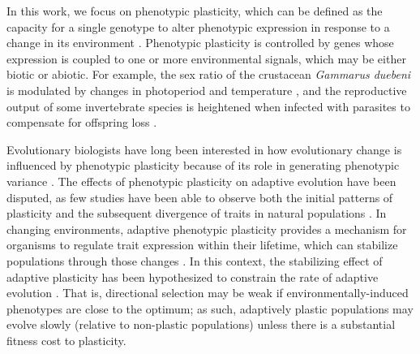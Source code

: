 \begin{raggedbottom}
In this work, we focus on phenotypic plasticity, which can be defined as the capacity for a single genotype to alter phenotypic expression in response to a change in its environment \citep{west-eberhard_developmental_2003}.
Phenotypic plasticity is controlled by genes whose expression is coupled to one or more environmental signals, which may be either biotic or abiotic.
For example, the sex ratio of the crustacean \textit{Gammarus duebeni} is modulated by changes in photoperiod and temperature \citep{dunn_two_2005}, and the reproductive output of some invertebrate species is heightened when infected with parasites to compensate for offspring loss \citep{chadwick_parasite-mediated_2005}.


Evolutionary biologists have long been interested in how evolutionary change is influenced by phenotypic plasticity because of its role in generating phenotypic variance \citep{gibert_phenotypic_2019}.
The effects of phenotypic plasticity on adaptive evolution have been disputed, as few studies have been able to observe both the initial patterns of plasticity and the subsequent divergence of traits in natural populations \citep{ghalambor_adaptive_2007,wund_assessing_2012,forsman_rethinking_2015,ghalambor_non-adaptive_2015,hendry_key_2016}.
In changing environments, adaptive phenotypic plasticity provides a mechanism for organisms to regulate trait expression within their lifetime, which can stabilize populations through those changes \citep{gibert_phenotypic_2019}.
In this context, the stabilizing effect of adaptive plasticity has been hypothesized to constrain the rate of adaptive evolution \citep{gupta_study_1982,ancel_undermining_2000,huey_behavioral_2003,price_role_2003,paenke_influence_2007}.
That is, directional selection may be weak if environmentally-induced phenotypes are close to the optimum; as such, adaptively plastic populations may evolve slowly (relative to non-plastic populations) unless there is a substantial fitness cost to plasticity.


\end{raggedbottom}
